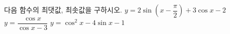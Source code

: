 다음 함수의 최댓값, 최솟값을 구하시오.
 $y=2\sin\left(x-\dfrac{\pi}{2}\right)+3\cos x-2$
 $y=\dfrac{\cos x}{\cos x-3}$
 $y=\cos^2 x-4\sin x-1$
